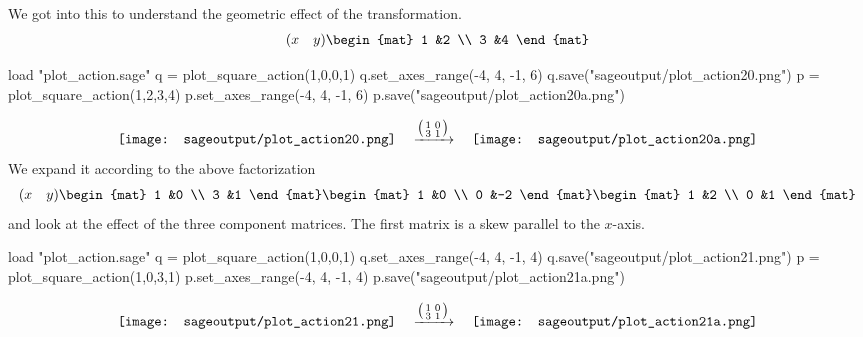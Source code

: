 We got into this to understand the geometric effect of the transformation.
\begin{equation*}
  \rowvec{x &y}
  \begin{mat}
   1 &2 \\
   3 &4 
  \end{mat}
\end{equation*}
\begin{sageoutput}[d,0,4;d,5,7]
load "plot_action.sage"
q = plot_square_action(1,0,0,1) 
q.set_axes_range(-4, 4, -1, 6) 
q.save("sageoutput/plot_action20.png")
p = plot_square_action(1,2,3,4) 
p.set_axes_range(-4, 4, -1, 6) 
p.save("sageoutput/plot_action20a.png")
\end{sageoutput}
\begin{equation*}
  \vcenteredhbox{\texttt{[image: sageoutput/plot\_action20.png]}}
  \quad\mapsvia{\big (\begin{smallmatrix} 1 &0 \\ 3 &1 \end{smallmatrix}\big )}\quad
  \vcenteredhbox{\texttt{[image: sageoutput/plot\_action20a.png]}}
\end{equation*}
\noindent We expand it according to the above factorization 
\begin{equation*}
  \rowvec{x &y}
  \begin{mat}
   1 &0 \\
   3 &1 
  \end{mat}
  \begin{mat}
    1 &0 \\
    0 &-2
  \end{mat}
  \begin{mat}
    1 &2 \\
    0 &1
  \end{mat}  
\end{equation*}
and look at the effect of the three component matrices.
The first matrix is a skew parallel to the $x$-axis.
\begin{sageoutput}[d,0,4;d,5,7]
load "plot_action.sage"
q = plot_square_action(1,0,0,1) 
q.set_axes_range(-4, 4, -1, 4) 
q.save("sageoutput/plot_action21.png")
p = plot_square_action(1,0,3,1) 
p.set_axes_range(-4, 4, -1, 4) 
p.save("sageoutput/plot_action21a.png")
\end{sageoutput}
\begin{equation*}
  \vcenteredhbox{\texttt{[image: sageoutput/plot\_action21.png]}}
  \quad\mapsvia{\big (\begin{smallmatrix} 1 &0 \\ 3 &1 \end{smallmatrix}\big )}\quad
  \vcenteredhbox{\texttt{[image: sageoutput/plot\_action21a.png]}}
\end{equation*}
